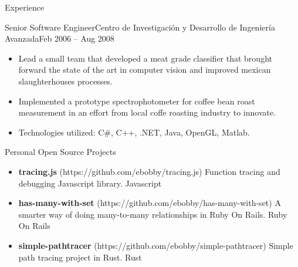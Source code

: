 \documentclass[calibri]{mcdowellcv}
\begin{document}
\begin{cvsection}{Experience}
\begin{cvsubsection}{Senior Software Engineer}{Centro de Investigación y Desarrollo de Ingeniería Avanzada}{Feb 2006 -- Aug 2008}
\begin{itemize}
			\item Lead a small team that developed a meat grade classifier that brought forward the state of the art in computer vision and improved mexican slaughterhouses processes.
			\item Implemented a prototype spectrophotometer for coffee bean roast measurement in an effort from local coffe roasting industry to innovate.
			\item Technologies utilized: C\#, C++, .NET, Java, OpenGL, Matlab.
		\end{itemize}
	\end{cvsubsection}
\end{cvsection}
\vskip 0.3in
\begin{cvsection}{Personal Open Source Projects}
	\begin{cvsubsection}{}{}{}
		\begin{itemize}
			\setlength\itemsep{3pt}
			\item \textbf{tracing.js} (https://github.com/ebobby/tracing.js)  Function tracing and debugging Javascript library. Javascript
			\item \textbf{has-many-with-set} (https://github.com/ebobby/has-many-with-set)  A smarter way of doing many-to-many relationships in Ruby On Rails. Ruby On Rails
			\item \textbf{simple-pathtracer} (https://github.com/ebobby/simple-pathtracer)  Simple path tracing project in Rust. Rust
		\end{itemize}
	\end{cvsubsection}
\end{cvsection}
\end{document}
